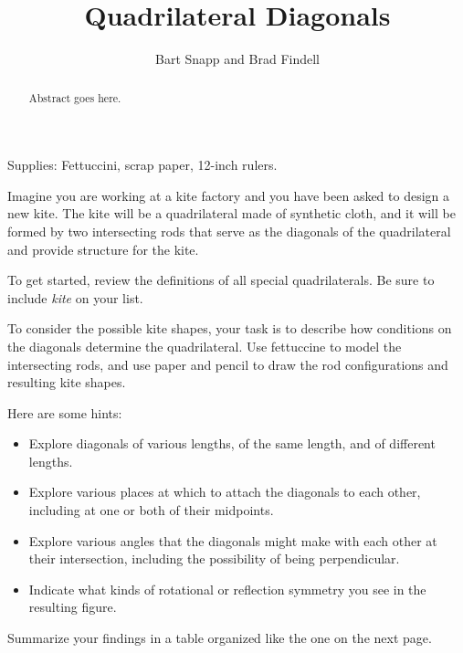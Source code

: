 \documentclass{ximera}
\title{Quadrilateral Diagonals}
\author{Bart Snapp and Brad Findell}
\begin{document}
\begin{abstract}
Abstract goes here.  
\end{abstract}
\maketitle

\begin{teachingnote}
Supplies:  Fettuccini, scrap paper, 12-inch rulers.
\end{teachingnote}

Imagine you are working at a kite factory and you have been asked to design a new kite.  The kite will be a quadrilateral made of synthetic cloth, and it will be formed by two intersecting rods that serve as the diagonals of the quadrilateral and provide structure for the kite.  

\begin{problem}
To get started, review the definitions of all special quadrilaterals.  Be sure to include \emph{kite} on your list.  
\end{problem}

\begin{problem}
To consider the possible kite shapes, your task is to describe how conditions on the diagonals determine the quadrilateral.  Use fettuccine to model the intersecting rods, and use paper and pencil to draw the rod configurations and resulting kite shapes.  

Here are some hints:  

\begin{itemize}
\item Explore diagonals of various lengths, of the same length, and of different lengths.  
\item Explore various places at which to attach the diagonals to each other, including at one or both of their midpoints.  
\item Explore various angles that the diagonals might make with each other at their intersection, including the possibility of being perpendicular.  
\item Indicate what kinds of rotational or reflection symmetry you see in the resulting figure.
\end{itemize}
\end{problem}

\begin{problem}
Summarize your findings in a table organized like the one on the next page.  
\end{problem}
\end{document}

